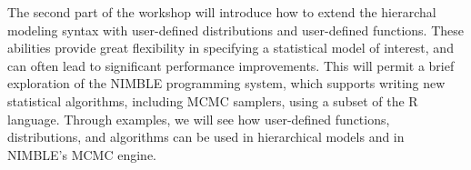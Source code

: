 \documentclass[11pt]{article}
\begin{document}
The second part of the workshop will introduce how to extend the hierarchal modeling syntax with user-defined distributions and user-defined functions.  These abilities provide great flexibility in specifying a statistical model of interest, and can often lead to significant performance improvements.  This will permit a brief exploration of the NIMBLE programming system, which supports writing new statistical algorithms, including MCMC samplers, using a subset of the R language.  Through examples, we will see how user-defined functions, distributions, and algorithms can be used in hierarchical models and in NIMBLE's MCMC engine.


%
%
\end{document}
